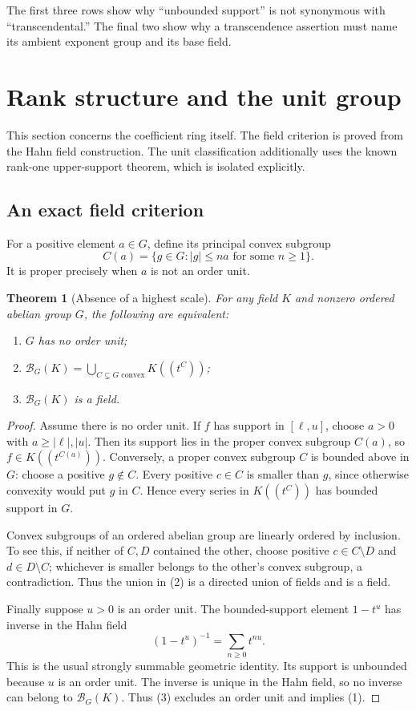 \documentclass[11pt,letterpaper]{article}
\newtheorem{theorem}{Theorem}[section]
\theoremstyle{definition}
\theoremstyle{remark}
\newcommand{\HH}[2]{#1((t^{#2}))}
\newcommand{\BB}[2]{\mathcal B_{#2}(#1)}
\newcommand{\abs}[1]{\lvert #1\rvert}
\begin{document}
The first three rows show why ``unbounded support'' is not synonymous with
``transcendental.'' The final two show why a transcendence assertion must
name its ambient exponent group and its base field.

\section{Rank structure and the unit group}\label{bst:sec:rank}

This section concerns the coefficient ring itself. The field criterion is
proved from the Hahn field construction. The unit classification additionally
uses the known rank-one upper-support theorem, which is isolated explicitly.

\subsection{An exact field criterion}

For a positive element $a\in G$, define its principal convex subgroup
\[
 C(a)=\{g\in G:\abs g\le na\text{ for some }n\ge1\}.
\]
It is proper precisely when $a$ is not an order unit.

\begin{theorem}[Absence of a highest scale]\label{bst:thm:fieldcriterion}
For any field $K$ and nonzero ordered abelian group $G$, the following are
equivalent:
\begin{enumerate}
\item $G$ has no order unit;
\item $\displaystyle\BB KG=\bigcup_{C\subsetneq G\text{ convex}}\HH KC$;
\item $\BB KG$ is a field.
\end{enumerate}
\end{theorem}
\begin{proof}
Assume there is no order unit. If $f$ has support in $[\ell,u]$, choose
$a>0$ with $a\ge\abs\ell,\abs u$. Then its support lies in the proper
convex subgroup $C(a)$, so $f\in\HH K{C(a)}$. Conversely, a proper convex
subgroup $C$ is bounded above in $G$: choose a positive $g\notin C$.
Every positive $c\in C$ is smaller than $g$, since otherwise convexity
would put $g$ in $C$. Hence every series in $\HH KC$ has bounded support
in $G$.

Convex subgroups of an ordered abelian group are linearly ordered by
inclusion. To see this, if neither of $C,D$ contained the other, choose
positive $c\in C\setminus D$ and $d\in D\setminus C$; whichever is smaller
belongs to the other's convex subgroup, a contradiction. Thus the union
in (2) is a directed union of fields and is a field.

Finally suppose $u>0$ is an order unit. The bounded-support element
$1-t^u$ has inverse in the Hahn field
\[
 (1-t^u)^{-1}=\sum_{n\ge0}t^{nu}.
\]
This is the usual strongly summable geometric identity. Its support is
unbounded because $u$ is an order unit. The inverse is unique in the Hahn
field, so no inverse can belong to $\BB KG$. Thus (3) excludes an order
unit and implies (1).
\end{proof}
\end{document}
